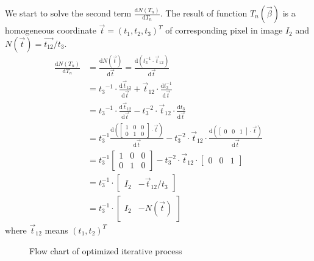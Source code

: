 We start to solve the second term $\frac{\mathrm{d} N(T_n)}{\mathrm{d} T_n}$. The result of function $T_n(\vec{\beta})$ is a homogeneous coordinate $\vec{t} = (t_1, t_2, t_3)^T$ of corresponding pixel in image $I_2$ and $N(\vec{t}) = \vec{t_{12}}/t_3$. 
\begin{align} \label{eq:n}
	\frac{\mathrm{d} N(T_n)}{\mathrm{d} T_n} &= \frac{\mathrm{d}N(\vec{t})}{\mathrm{d} \vec{t}} = \frac{\mathrm{d}(t_3^{-1}\cdot \vec{t}_{12})}{\mathrm{d}\vec{t}} \nonumber \\
	&= {t_3}^{-1} \cdot \frac{\mathrm{d} \vec{t}_{12}}{\mathrm{d} \vec{t}} +  \vec{t}_{12} \cdot \frac{\mathrm{d} t_3^{-1}}{\mathrm{d}\vec{t}} \nonumber \\
	& = {t_3}^{-1} \cdot \frac{\mathrm{d} \vec{t}_{12}}{\mathrm{d} \vec{t}} - t_3^{-2}\cdot \vec{t}_{12} \cdot \frac{\mathrm{d} t_3}{\mathrm{d} \vec{t}}\nonumber \\
	&= t_3^{-1}\frac{\mathrm{d}\left(\begin{bmatrix}1 & 0 &0 \\ 0 & 1 & 0 \end{bmatrix} \cdot \vec{t}\right)}{\mathrm{d} \vec{t}} - t_3^{-2}\cdot \vec{t}_{12} \cdot \frac{\mathrm{d} \left(\begin{bmatrix} 0 & 0 & 1 \end{bmatrix}\cdot \vec{t}\right)}{\mathrm{d} \vec{t}}\nonumber \\
	&= t_3^{-1}\begin{bmatrix}1 & 0 &0 \\ 0 & 1 & 0 \end{bmatrix} - t_3^{-2}\cdot \vec{t}_{12} \cdot \begin{bmatrix} 0 & 0 & 1 \end{bmatrix}\nonumber \\
	&=  t_3^{-1} \cdot \begin{bmatrix} I_2 & - \vec{t}_{12}/t_3 \end{bmatrix} \nonumber \\
	& = t_3^{-1} \cdot \begin{bmatrix} I_2 & - N(\vec{t}) \end{bmatrix}
\end{align}
where $\vec{t}_{12} $ means $ (t_1, t_2)^T$

\begin{figure}[tbp]
	\centering
	
	\caption{Flow chart of optimized iterative process}
	\label{fig:optimized iterative process}
\end{figure}

